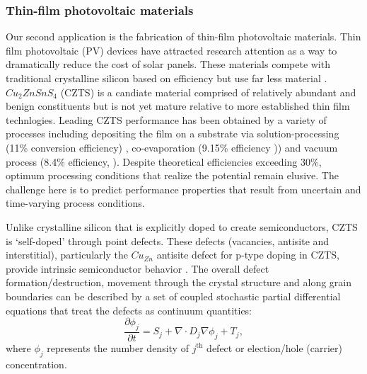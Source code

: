 \documentclass[11pt]{article}
\newcommand{\MarginPar}[1]{\marginpar{%
\vskip-\baselineskip %
\raggedright\tiny\sffamily
\hrule\smallskip{\color{red}#1}\par\smallskip\hrule}}
\begin{document}
\subsubsection*{Thin-film photovoltaic materials}
Our second  application 
is the fabrication of thin-film photovoltaic
materials. 
\MarginPar{JBB:  maybe too long}
Thin film photovoltaic (PV) devices have attracted research attention
as a way to dramatically reduce the cost of solar panels. These
materials compete with traditional crystalline silicon based on
efficiency but use far less
material \cite{JiangY13}. 
$Cu_2ZnSnS_4$ (CZTS) \cite{JiangY13} is a candiate material
comprised of relatively abundant and benign constituents but is not yet mature relative to more established thin film technlogies. 
Leading  CZTS  performance has been obtained by a variety of processes including depositing the film on a substrate via
solution-processing (11\% conversion efficiency) \cite{Todorov13},
co-evaporation (9.15\% efficiency \cite{Repins12})) and vacuum
process (8.4\% efficiency, \cite{Shin11}). Despite theoretical
efficiencies exceeding 30\%,  optimum processing conditions
that realize the potential remain elusive.
The challenge here is to 
predict performance properties that result from uncertain and time-varying process
conditions.

Unlike crystalline silicon that is explicitly doped
to create  semiconductors, CZTS is
`self-doped' through point defects.
These defects (vacancies, antisite and interstitial), particularly
the $Cu_{Zn}$ antisite defect for p-type doping in CZTS, provide intrinsic 
semiconductor behavior
\cite{JiangY13}. The overall defect formation/destruction, movement
through the crystal structure and along grain boundaries can be
described by a set of coupled stochastic partial differential
equations that treat the defects as continuum
quantities:
\begin{equation}
  \label{eq:pdpde}
  \frac{\partial \phi_j}{\partial t}  = S_j + \nabla \cdot  D_j \nabla \phi_j  + T_j,
\end{equation}
where $\phi_j$ represents the number density of $j^\mathrm{th}$ defect or election/hole (carrier) concentration. 
\end{document}
